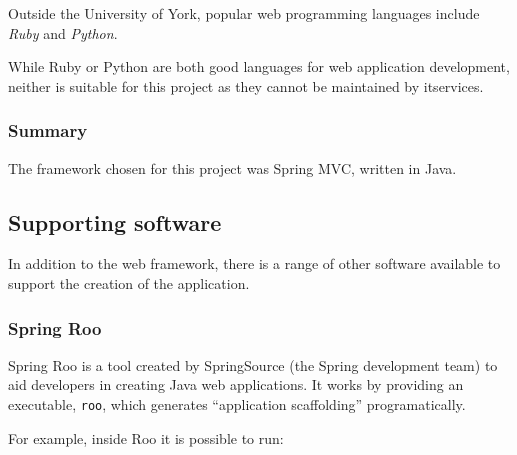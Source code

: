 \documentclass[]{scrartcl}
\begin{document}

Outside the University of York, popular web programming languages include
\emph{Ruby} and \emph{Python}.

% 
% 

While Ruby or Python are both good languages for web application development,
neither is suitable for this project as they cannot be maintained by
\gls{itservices}.

\subsubsection{Summary}


The framework chosen for this project was Spring MVC, written in Java.


\subsection{Supporting software}

In addition to the web framework, there is a range of other software available
to support the creation of the application.

\subsubsection{Spring Roo}

Spring Roo is a tool created by SpringSource (the Spring development team) to
aid developers in creating Java web applications. It works by providing an
executable, \texttt{roo}, which generates ``application scaffolding''
programatically.

For example, inside Roo it is possible to run:
\end{document}
